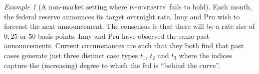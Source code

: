 \documentclass[ecta,nameyear,draft]{econsocart}
\newcommand{\fourdiv}{\textsc{iv}-\textsc{diversity}}
\theoremstyle{plain}
\theoremstyle{remark}
\newtheorem{example}{Example}%
\begin{document}
\begin{example}[A non-market setting where \fourdiv\ fails to hold]
  \label{eg-rates} Each month, the federal reserve announces its target
  overnight rate.  Inny and {Pru} wish to forecast the next announcement. The
  consensus is that there will be a rate rise of ${0}, {25}$ or ${50}$ basis
  points.  Inny and {Pru} have observed the same past announcements.  Current
  circumstances are such that they both find that past cases generate just
  three distinct case types $t_1$, $t_2$ and $t_3$ where the indices capture
  the (increasing) degree to which the fed is ``behind the curve''.
 

\end{example}
\end{document}
